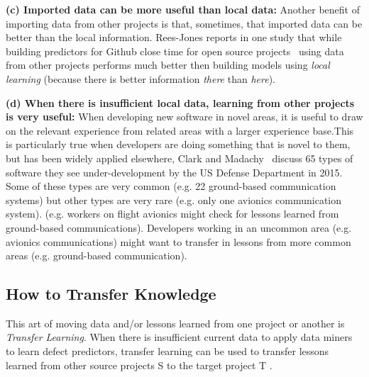 \documentclass[10pt,journal,compsoc]{IEEEtran}
\newcommand{\respto}[1]{
\fcolorbox{black}{black!15}{%
\label{resp:#1}%
\bf\scriptsize R{#1}}}
\begin{document}



\textbf{(c) Imported data can be more useful than local data:} Another benefit of  importing data from other projects is that, sometimes, that imported data can be better than the local information. Rees-Jones reports in one study that while building predictors
for Github close time  for open source projects~\cite{rees2017better} using data from other projects performs much better then building models using {\em local learning} (because there is better  information {\em there} than {\em here}).


\textbf{(d) When there is insufficient local data, learning from other projects is very useful:} When developing new software in  novel areas, it is useful to draw on the relevant  experience  from related areas with a larger experience base.This is particularly true when developers are doing something that is novel to them, but has been widely applied elsewhere, Clark and Madachy~\cite{clark15} discuss 65 types of software they see        under-development by the US Defense Department in 2015.   Some of these types are very common (e.g. 22 ground-based communication systems) but other types are very rare (e.g. only  one avionics communication system). (e.g. workers on   flight avionics   might check for lessons learned from ground-based communications). Developers  working in an uncommon area (e.g. avionics communications) might want to transfer in lessons from more common areas (e.g. ground-based communication).

\subsection{ How to  Transfer Knowledge}
This     art of moving data and/or lessons learned from one project or another is {\em Transfer Learning}. When there is insufficient current data to apply data miners to learn defect predictors, transfer learning can be used to transfer lessons learned from other source projects S to the target project T .
\end{document}
